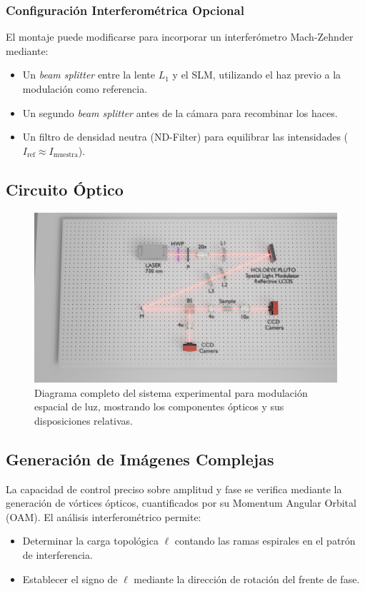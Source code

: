 \subsubsection{Configuración Interferométrica Opcional}
El montaje puede modificarse para incorporar un interferómetro Mach-Zehnder mediante:
\begin{itemize}
	\item Un \textit{beam splitter} entre la lente $L_1$ y el SLM, utilizando el haz previo a la modulación como referencia.
	\item Un segundo \textit{beam splitter} antes de la cámara para recombinar los haces.
	\item Un filtro de densidad neutra (ND-Filter) para equilibrar las intensidades ($I_{\text{ref}} \approx I_{\text{muestra}}$).
\end{itemize}

\subsection{Circuito Óptico}
\begin{figure}[H]
	\centering
	\includegraphics[width=0.8\linewidth, trim={21cm 5cm 7cm 5cm}, clip]{media/SLM_setupv1}
	\caption[Diagrama del sistema de modulación espacial de luz]{Diagrama completo del sistema experimental para modulación espacial de luz, mostrando los componentes ópticos y sus disposiciones relativas.}
	\label{fig:SLM_setup}
\end{figure}

\subsection{Generación de Imágenes Complejas \label{cap:oam}}
La capacidad de control preciso sobre amplitud y fase se verifica mediante la generación de vórtices ópticos, cuantificados por su Momentum Angular Orbital (OAM). El análisis interferométrico permite:
\begin{itemize}
	\item Determinar la carga topológica $\ell$ contando las ramas espirales en el patrón de interferencia.
	\item Establecer el signo de $\ell$ mediante la dirección de rotación del frente de fase.
\end{itemize}

